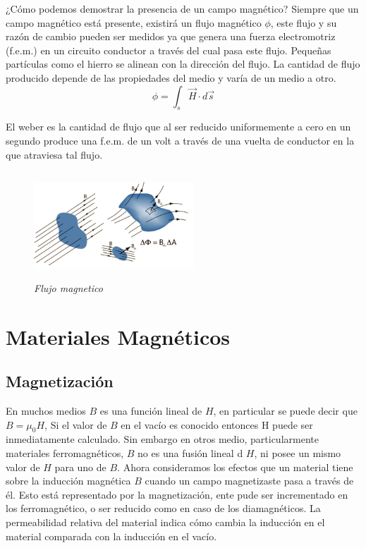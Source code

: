 ¿Cómo podemos demostrar la presencia de un campo magnético?
Siempre que un campo magnético está presente, existirá un flujo magnético $ \phi$, este flujo y su razón de cambio pueden ser medidos ya que genera una fuerza electromotriz (f.e.m.) en un circuito conductor a través del cual pasa este flujo. Pequeñas partículas como el hierro se alinean con la dirección del flujo. La cantidad de flujo producido depende de las propiedades del medio y varía de un medio a otro.
\begin{equation}
	\phi = \int_{s}^{} \overrightarrow{H} \cdot d \overrightarrow{s}
\end{equation}

El weber es la cantidad de flujo que al ser reducido uniformemente a cero en un segundo produce una f.e.m. de un volt a través de una vuelta de conductor en la que atraviesa tal flujo.
\begin{figure}[htb]
\begin{center}
\centering
	\includegraphics[width=6cm, height=4cm]{images/Capitulo_1/Flujo_magnetico}
	\caption{\textit{Flujo magnetico}}
	\label{fig:system:example1}	
\end{center}
\end{figure}

\section{Materiales Magnéticos}
\label{sec:related:sec3}
\subsection{Magnetización}

En muchos medios $B$ es una función lineal de $H$, en particular se puede decir que $B=\mu_0 H$, Si el valor de $B$ en el vacío es conocido entonces H puede ser inmediatamente calculado.
Sin embargo en otros medio, particularmente materiales ferromagnéticos, $B$ no es una fusión lineal d $H$, ni posee un mismo valor de $H$ para uno de $B$.
Ahora consideramos los efectos que un material tiene sobre la inducción magnética $B$ cuando un campo magnetizaste pasa a través de él. Esto está representado por la magnetización, ente pude ser incrementado en los ferromagnético, o ser reducido como en caso de los diamagnéticos. La permeabilidad relativa del material indica cómo cambia la inducción en el material comparada con la inducción en el vacío.\\\\\\

